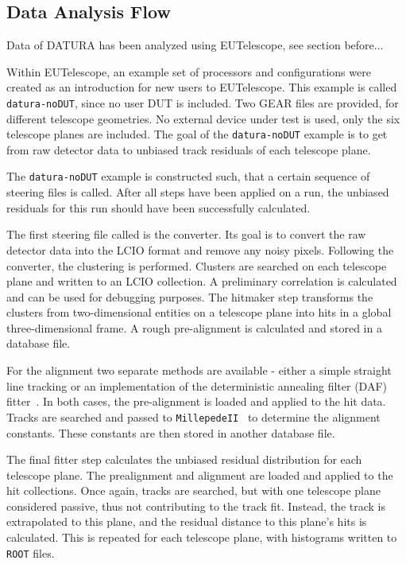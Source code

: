 \subsection{Data Analysis Flow}

Data of DATURA has been analyzed using EUTelescope, see section before...

\label{sec:datura-nodut}
Within EUTelescope, an example set of processors and configurations were created as an introduction for new users to EUTelescope.
This example is called \texttt{datura-noDUT}, since no user DUT is included.
Two GEAR files are provided, for different telescope geometries.
No external device under test is used, only the six \Mimosa telescope planes are included.
The goal of the \texttt{datura-noDUT} example is to get from raw detector data to unbiased track residuals of each telescope plane.

The \texttt{datura-noDUT} example is constructed such, that a certain sequence of steering files is called.
After all steps have been applied on a run, the unbiased residuals for this run should have been successfully calculated.

The first steering file called is the converter.
Its goal is to convert the raw \Mimosa detector data into the LCIO format and remove any noisy pixels.
Following the converter, the clustering is performed.
Clusters are searched on each telescope plane and written to an LCIO collection.
A preliminary correlation is calculated and can be used for debugging purposes.
The hitmaker step transforms the clusters from two-dimensional entities on a telescope plane into hits in a global three-dimensional frame.
A rough pre-alignment is calculated and stored in a database file.

For the alignment two separate methods are available - either a simple straight line tracking or an implementation of the deterministic annealing filter (DAF) fitter~\cite{ref:daffitter}.
In both cases, the pre-alignment is loaded and applied to the hit data.
Tracks are searched and passed to \texttt{MillepedeII}~\cite{Blobel-2006} to determine the alignment constants.
These constants are then stored in another database file.

The final fitter step calculates the unbiased residual distribution for each telescope plane.
The prealignment and alignment are loaded and applied to the hit collections.
Once again, tracks are searched, but with one telescope plane considered passive, thus not contributing to the track fit.
Instead, the track is extrapolated to this plane, and the residual distance to this plane's hits is calculated.
This is repeated for each telescope plane, with histograms written to \texttt{ROOT} files.

